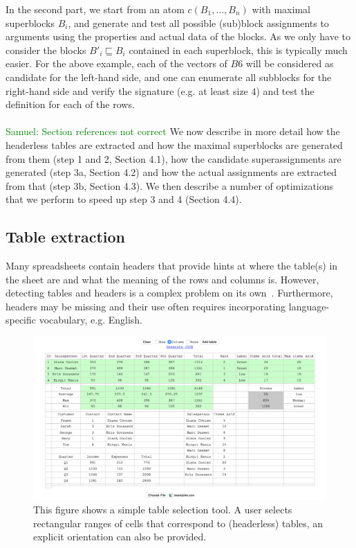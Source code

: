 \documentclass{IEEEtran}
\newcommand{\samuel}[1]{\textcolor{green}{{\sc Samuel:} #1}\xspace}
\theoremstyle{definition}
\begin{document}
In the second part, we start from an atom $c(B_1, \ldots ,B_n)$ with maximal superblocks $B_i$, and generate and test all possible (sub)block assignments to arguments using the properties and actual data of the blocks. As we only have to consider the blocks $B'_i \sqsubseteq B_i$ contained in each superblock, this is typically much easier. For the above example, each of the vectors of $B6$ will be considered as candidate for the left-hand side, and one can enumerate all subblocks for the right-hand side and verify the signature (e.g. at least size $4$) and test the definition for each of the rows. %
\\\\
\samuel{Section references not correct}
We now describe in more detail how the headerless tables are extracted and how the maximal superblocks are generated from them (step 1 and 2, Section 4.1), how the candidate superassignments are generated (step 3a, Section 4.2) and how the actual assignments are extracted from that (step 3b, Section 4.3). We then describe a number of optimizations that we perform to speed up step 3 and 4 (Section 4.4).





\subsection{Table extraction}
\label{sec:table_extraction}
Many spreadsheets contain headers that provide hints at where the table(s) in the sheet are and what the meaning of the rows and columns is. However, detecting tables and headers is a complex problem on its own~\cite{header}. Furthermore, headers may be missing and their use often requires incorporating language-specific vocabulary, e.g. English.

\begin{figure}[t]
  \centering
  \includegraphics[width=1\linewidth]{figures/tabletool.png}
  \caption{This figure shows a simple table selection tool. A user selects rectangular ranges of cells that correspond to (headerless) tables, an explicit orientation can also be provided.}
  \label{fig:visual_tool}
\end{figure}
\end{document}
